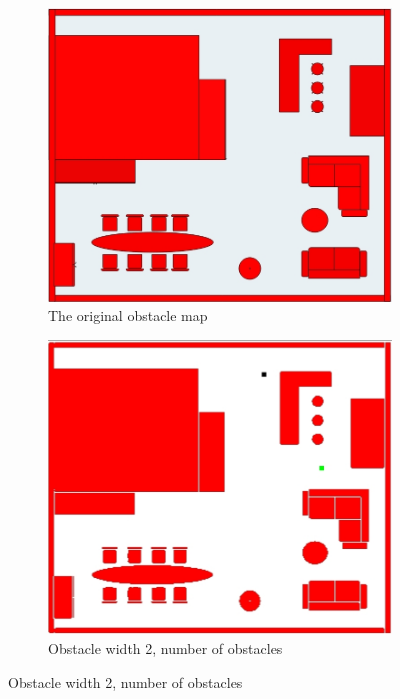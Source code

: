 \begin{enumerate}
\begin{figure}[!h]
	\begin{subfigure}[b]{.5\textwidth}
		\centering
		\includegraphics[width=.95\linewidth]{figures/real_map.jpg}
		\caption{The original obstacle map}
		\label{fig:obsmap_sfig1}
	\end{subfigure}%
	\begin{subfigure}[b]{.5\textwidth}
		\centering
		\includegraphics[width=.95\linewidth]{figures/obs_width_2_total_obs_51348.jpg}
		\caption{Obstacle width 2, number of obstacles}
		\label{fig:obsmap_sfig2}
	\end{subfigure}%

\end{figure}
\end{enumerate}

